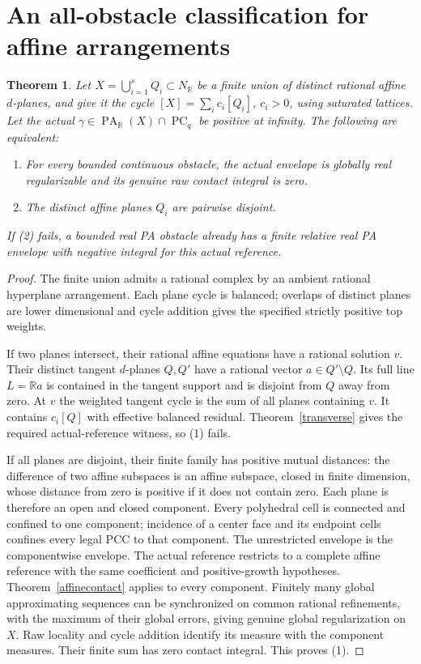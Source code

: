\documentclass[11pt]{article}
\newtheorem{theorem}{Theorem}
\newcommand{\R}{\mathbb R}
\newcommand{\PC}{\operatorname{PC}_q}
\newcommand{\PA}{\operatorname{PA}}
\begin{document}
\section{An all-obstacle classification for affine arrangements}
\begin{theorem}\label{arrangement}
Let $X=\bigcup_{i=1}^s Q_i\subset N_\R$ be a finite union of distinct
rational affine $d$-planes, and give it the cycle
$[X]=\sum_i c_i[Q_i]$, $c_i>0$, using saturated lattices. Let the
actual $\gamma\in\PA_\R(X)\cap\PC$ be positive at infinity.
The following are equivalent:
\begin{enumerate}
\item For every bounded continuous obstacle, the actual envelope is
globally real regularizable and its genuine raw contact integral is zero.
\item The distinct affine planes $Q_i$ are pairwise disjoint.
\end{enumerate}
If (2) fails, a bounded real PA obstacle already has a finite relative
real PA envelope with negative integral for this actual reference.
\end{theorem}
\begin{proof}
The finite union admits a rational complex by an ambient rational
hyperplane arrangement. Each plane cycle is balanced; overlaps of
distinct planes are lower dimensional and cycle addition gives the
specified strictly positive top weights.

If two planes intersect, their rational affine equations have a rational
solution $v$. Their distinct tangent $d$-planes $Q,Q'$ have a rational
vector $a\in Q'\setminus Q$. Its full line $L=\R a$ is contained
in the tangent support and is disjoint from $Q$ away from zero.
At $v$ the weighted tangent cycle is the sum of all planes containing
$v$. It contains $c_i[Q]$ with effective balanced residual.
Theorem~\ref{transverse} gives the required actual-reference witness,
so (1) fails.

If all planes are disjoint, their finite family has positive mutual
distances: the difference of two affine subspaces is an affine subspace,
closed in finite dimension, whose distance from zero is positive if
it does not contain zero. Each plane is therefore an open and closed
component. Every polyhedral cell is connected and confined to one
component; incidence of a center face and its endpoint cells confines
every legal PCC to that component. The unrestricted envelope is the
componentwise envelope. The actual reference restricts to a complete
affine reference with the same coefficient and positive-growth
hypotheses. Theorem~\ref{affinecontact} applies to every component.
Finitely many global approximating sequences can be synchronized on
common rational refinements, with the maximum of their global errors,
giving genuine global regularization on $X$. Raw locality and cycle
addition identify its measure with the component measures. Their
finite sum has zero contact integral. This proves (1).
\end{proof}
\end{document}
